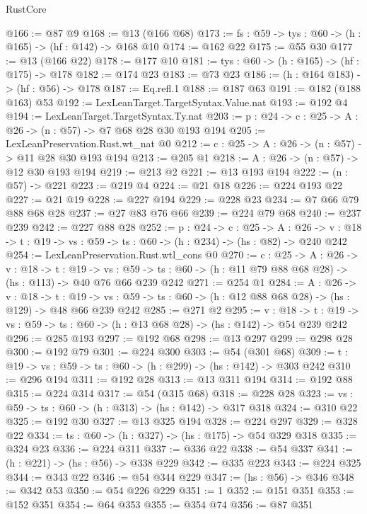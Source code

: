\begin{lexlean}{RustCore}
\begin{coremodule}
@166 := @87 @9
@168 := @13 (@166 @68)
@173 := {fs : @59} -> {tys : @60} -> (h : @165) -> (hf : @142) -> @168 @10
@174 := @162 @22
@175 := @55 @30
@177 := @13 (@166 @22)
@178 := @177 @10
@181 := {tys : @60} -> (h : @165) -> (hf : @175) -> @178
@182 := @174 @23
@183 := @73 @23
@186 := (h : @164 @183) -> (hf : @56) -> @178
@187 := Eq.refl.{1}
@188 := @187 @63
@191 := @182 (@188 @163) @53
@192 := LexLeanTarget.TargetSyntax.Value.nat
@193 := @192 @4
@194 := LexLeanTarget.TargetSyntax.Ty.nat
@203 := {p : @24} -> {c : @25} -> {A : @26} -> (n : @57) -> @7 @68 @28 @30 @193 @194
@205 := LexLeanPreservation.Rust.wt_nat @0
@212 := {c : @25} -> {A : @26} -> (n : @57) -> @11 @28 @30 @193 @194
@213 := @205 @1
@218 := {A : @26} -> (n : @57) -> @12 @30 @193 @194
@219 := @213 @2
@221 := @13 @193 @194
@222 := (n : @57) -> @221
@223 := @219 @4
@224 := @21 @18
@226 := @224 @193 @22
@227 := @21 @19
@228 := @227 @194
@229 := @228 @23
@234 := @7 @66 @79 @88 @68 @28
@237 := @27 @83 @76 @66
@239 := @224 @79 @68
@240 := @237 @239
@242 := @227 @88 @28
@252 := {p : @24} ->
  {c : @25} ->
  {A : @26} ->
  {v : @18} -> {t : @19} -> {vs : @59} -> {ts : @60} -> (h : @234) -> (hs : @82) -> @240 @242
@254 := LexLeanPreservation.Rust.wtl_cons @0
@270 := {c : @25} ->
  {A : @26} ->
  {v : @18} ->
  {t : @19} ->
  {vs : @59} -> {ts : @60} -> (h : @11 @79 @88 @68 @28) -> (hs : @113) -> @40 @76 @66 @239 @242
@271 := @254 @1
@284 := {A : @26} ->
  {v : @18} ->
  {t : @19} -> {vs : @59} -> {ts : @60} -> (h : @12 @88 @68 @28) -> (hs : @129) -> @48 @66 @239 @242
@285 := @271 @2
@295 := {v : @18} ->
  {t : @19} -> {vs : @59} -> {ts : @60} -> (h : @13 @68 @28) -> (hs : @142) -> @54 @239 @242
@296 := @285 @193
@297 := @192 @68
@298 := @13 @297
@299 := @298 @28
@300 := @192 @79
@301 := @224 @300
@303 := @54 (@301 @68)
@309 := {t : @19} -> {vs : @59} -> {ts : @60} -> (h : @299) -> (hs : @142) -> @303 @242
@310 := @296 @194
@311 := @192 @28
@313 := @13 @311 @194
@314 := @192 @88
@315 := @224 @314
@317 := @54 (@315 @68)
@318 := @228 @28
@323 := {vs : @59} -> {ts : @60} -> (h : @313) -> (hs : @142) -> @317 @318
@324 := @310 @22
@325 := @192 @30
@327 := @13 @325 @194
@328 := @224 @297
@329 := @328 @22
@334 := {ts : @60} -> (h : @327) -> (hs : @175) -> @54 @329 @318
@335 := @324 @23
@336 := @224 @311
@337 := @336 @22
@338 := @54 @337
@341 := (h : @221) -> (hs : @56) -> @338 @229
@342 := @335 @223
@343 := @224 @325
@344 := @343 @22
@346 := @54 @344 @229
@347 := (hs : @56) -> @346
@348 := @342 @53
@350 := @54 @226 @229
@351 := 1
@352 := @151 @351
@353 := @152 @351
@354 := @64 @353
@355 := @354 @74
@356 := @87 @351

\end{coremodule}
\end{lexlean}
